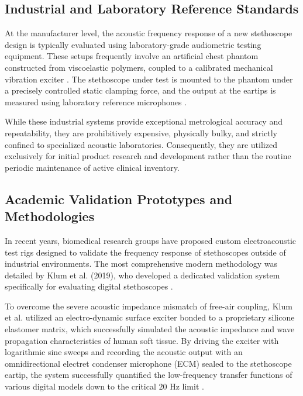 \subsection{Industrial and Laboratory Reference Standards}

At the manufacturer level, the acoustic frequency response of a new stethoscope design is typically evaluated using laboratory-grade audiometric testing equipment. These setups frequently involve an artificial chest phantom constructed from viscoelastic polymers, coupled to a calibrated mechanical vibration exciter \cite{pasterkamp1997respiratory}. The stethoscope under test is mounted to the phantom under a precisely controlled static clamping force, and the output at the eartips is measured using laboratory reference microphones \cite{klum2019validation}. 

While these industrial systems provide exceptional metrological accuracy and repeatability, they are prohibitively expensive, physically bulky, and strictly confined to specialized acoustic laboratories. Consequently, they are utilized exclusively for initial product research and development rather than the routine periodic maintenance of active clinical inventory.

\subsection{Academic Validation Prototypes and Methodologies}

In recent years, biomedical research groups have proposed custom electroacoustic test rigs designed to validate the frequency response of stethoscopes outside of industrial environments. The most comprehensive modern methodology was detailed by Klum et al. (2019), who developed a dedicated validation system specifically for evaluating digital stethoscopes \cite{klum2019validation}. 

To overcome the severe acoustic impedance mismatch of free-air coupling, Klum et al. utilized an electro-dynamic surface exciter bonded to a proprietary silicone elastomer matrix, which successfully simulated the acoustic impedance and wave propagation characteristics of human soft tissue. By driving the exciter with logarithmic sine sweeps and recording the acoustic output with an omnidirectional electret condenser microphone (ECM) sealed to the stethoscope eartip, the system successfully quantified the low-frequency transfer functions of various digital models down to the critical $20\text{ Hz}$ limit \cite{klum2019validation}.

